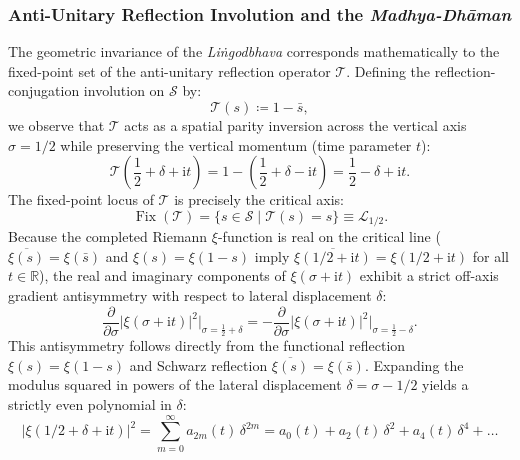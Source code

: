 \documentclass[11pt,a4paper,reqno]{article}
\theoremstyle{plain}
\theoremstyle{definition}
\theoremstyle{remark}
\numberwithin{equation}{section}
\begin{document}
\subsubsection{Anti-Unitary Reflection Involution and the \emph{Madhya-Dh\={a}man}}
The geometric invariance of the \emph{Li\.{n}godbhava} corresponds mathematically to the fixed-point set of the anti-unitary reflection operator $\mathcal{T}$. Defining the reflection-conjugation involution on $\mathcal{S}$ by:
\begin{equation}
  \mathcal{T}(s) \coloneqq 1 - \bar{s},
  \label{eq:involution_tau}
\end{equation}
we observe that $\mathcal{T}$ acts as a spatial parity inversion across the vertical axis $\sigma = 1/2$ while preserving the vertical momentum (time parameter $t$):
\begin{equation}
  \mathcal{T}\left(\frac{1}{2} + \delta + \mathrm{i}t\right) = 1 - \left(\frac{1}{2} + \delta - \mathrm{i}t\right) = \frac{1}{2} - \delta + \mathrm{i}t.
\end{equation}
The fixed-point locus of $\mathcal{T}$ is precisely the critical axis:
\begin{equation}
  \operatorname{Fix}(\mathcal{T}) = \big\{ s \in \mathcal{S} \;\big|\; \mathcal{T}(s) = s \big\} \equiv \mathcal{L}_{1/2}.
\end{equation}
Because the completed Riemann $\xi$-function is real on the critical line ($\overline{\xi(s)} = \xi(\bar{s})$ and $\xi(s) = \xi(1 - s)$ imply $\overline{\xi(1/2 + \mathrm{i}t)} = \xi(1/2 + \mathrm{i}t)$ for all $t \in \mathbb{R}$), the real and imaginary components of $\xi(\sigma + \mathrm{i}t)$ exhibit a strict off-axis gradient antisymmetry with respect to lateral displacement $\delta$:
\begin{equation}
  \frac{\partial}{\partial \sigma} \big| \xi(\sigma + \mathrm{i}t) \big|^2 \Big|_{\sigma = \frac{1}{2} + \delta} = -\frac{\partial}{\partial \sigma} \big| \xi(\sigma + \mathrm{i}t) \big|^2 \Big|_{\sigma = \frac{1}{2} - \delta}.
  \label{eq:gradient_antisymmetry}
\end{equation}
This antisymmetry follows directly from the functional reflection $\xi(s) = \xi(1-s)$ and Schwarz reflection $\overline{\xi(s)} = \xi(\bar{s})$. Expanding the modulus squared in powers of the lateral displacement $\delta = \sigma - 1/2$ yields a strictly even polynomial in $\delta$:
\begin{equation}
  \big| \xi(1/2 + \delta + \mathrm{i}t) \big|^2 = \sum_{m=0}^\infty a_{2m}(t) \, \delta^{2m} = a_0(t) + a_2(t)\,\delta^2 + a_4(t)\,\delta^4 + \dots
  \label{eq:even_polynomial_expansion}
\end{equation}
\end{document}
